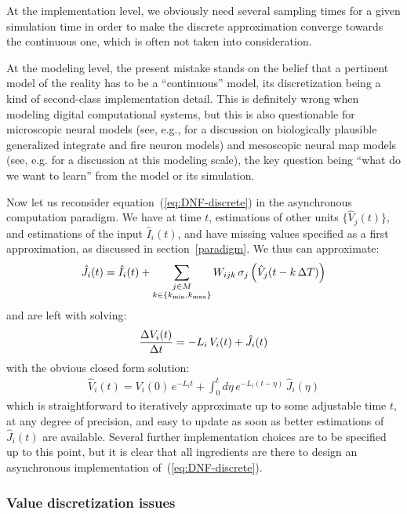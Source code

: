 At the implementation level, we obviously need several sampling times for a given simulation time in order to make the discrete approximation converge towards the continuous one,
which is often not taken into consideration. 

At the modeling level, the present mistake stands on the belief that a pertinent model of the reality has to be a ``continuous'' model, its discretization being a kind of second-class implementation detail. 
This is definitely wrong when modeling digital computational systems, but this is also questionable for microscopic neural models 
(see, e.g., \cite{Cessac:2008} for a discussion on biologically plausible generalized integrate and fire neuron models)
and mesoscopic neural map models (see, e.g. \cite{Rougier:2006} for a discussion at this modeling scale), 
the key question being ``what do we want to learn'' from the model or its simulation.

Now let us reconsider equation~(\ref{eq:DNF-discrete}) in the asynchronous computation paradigm. We have at time $t$, estimations of other units $\{\hat{V}_j(t)\}$, and estimations of the input $\hat{I}_i(t)$, and have missing values specified as a first approximation, as discussed in section~\ref{paradigm}. We thus can approximate:
\begin{align}
\hat{J}_i(t) = \hat{I}_i(t) + \sum_{\substack{j \in M\\k \in \{k_{\min}, k_{\max}\}}} W_{ijk} \, \sigma_j\left(\hat{V}_j(t - k\, \Delta T)\right) \notag
\end{align}
and are left with solving:
\begin{align}
\frac{\Delta V_i(t) }{\Delta t}  = - L_i \, V_i(t)  + \hat{J}_i(t) \notag
\end{align}
with the obvious closed form solution:
\begin{align}
\label{eq:DNF-solution}
\hat{V}_i(t) = V_i(0) \, e^{-L_i t} + \int_0^t d\eta \, e^{-L_i (t - \eta)} \, \hat{J}_i(\eta)
\end{align}
which is straightforward to iteratively approximate up to some adjustable time $t$, at any degree of precision, and easy to update as soon as better estimations of $\hat{J}_i(t)$ are available. Several further implementation choices are to be specified up to this point, but it is clear that all ingredients are there to design an asynchronous implementation of~(\ref{eq:DNF-discrete}).

\subsubsection{Value discretization issues}\label{dds}

